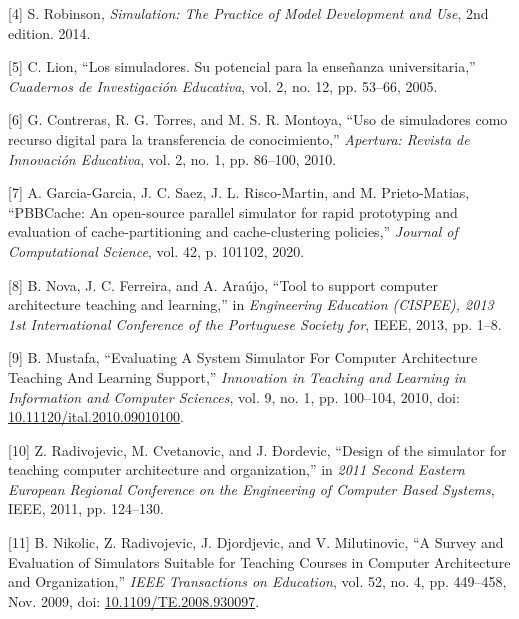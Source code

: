 \documentclass[12pt,twoside]{templates/unerthesis}
\begin{document}
\leavevmode\hypertarget{ref-robinson_simulation_2014}{}%
{[}4{]} S. Robinson, \emph{Simulation: The Practice of Model Development and Use}, 2nd edition. 2014.

\leavevmode\hypertarget{ref-lion_simuladores_2005}{}%
{[}5{]} C. Lion, ``Los simuladores. Su potencial para la enseñanza universitaria,'' \emph{Cuadernos de Investigación Educativa}, vol. 2, no. 12, pp. 53--66, 2005.

\leavevmode\hypertarget{ref-contreras_uso_2010}{}%
{[}6{]} G. Contreras, R. G. Torres, and M. S. R. Montoya, ``Uso de simuladores como recurso digital para la transferencia de conocimiento,'' \emph{Apertura: Revista de Innovación Educativa}, vol. 2, no. 1, pp. 86--100, 2010.

\leavevmode\hypertarget{ref-garcia-garcia_pbbcache_2020}{}%
{[}7{]} A. Garcia-Garcia, J. C. Saez, J. L. Risco-Martin, and M. Prieto-Matias, ``PBBCache: An open-source parallel simulator for rapid prototyping and evaluation of cache-partitioning and cache-clustering policies,'' \emph{Journal of Computational Science}, vol. 42, p. 101102, 2020.

\leavevmode\hypertarget{ref-nova_tool_2013}{}%
{[}8{]} B. Nova, J. C. Ferreira, and A. Araújo, ``Tool to support computer architecture teaching and learning,'' in \emph{Engineering Education (CISPEE), 2013 1st International Conference of the Portuguese Society for}, IEEE, 2013, pp. 1--8.

\leavevmode\hypertarget{ref-mustafa_evaluating_2010}{}%
{[}9{]} B. Mustafa, ``Evaluating A System Simulator For Computer Architecture Teaching And Learning Support,'' \emph{Innovation in Teaching and Learning in Information and Computer Sciences}, vol. 9, no. 1, pp. 100--104, 2010, doi: \href{https://doi.org/10.11120/ital.2010.09010100}{10.11120/ital.2010.09010100}.

\leavevmode\hypertarget{ref-radivojevic_design_2011}{}%
{[}10{]} Z. Radivojevic, M. Cvetanovic, and J. Ðordevic, ``Design of the simulator for teaching computer architecture and organization,'' in \emph{2011 Second Eastern European Regional Conference on the Engineering of Computer Based Systems}, IEEE, 2011, pp. 124--130.

\leavevmode\hypertarget{ref-nikolic_survey_2009}{}%
{[}11{]} B. Nikolic, Z. Radivojevic, J. Djordjevic, and V. Milutinovic, ``A Survey and Evaluation of Simulators Suitable for Teaching Courses in Computer Architecture and Organization,'' \emph{IEEE Transactions on Education}, vol. 52, no. 4, pp. 449--458, Nov. 2009, doi: \href{https://doi.org/10.1109/TE.2008.930097}{10.1109/TE.2008.930097}.
\end{document}
